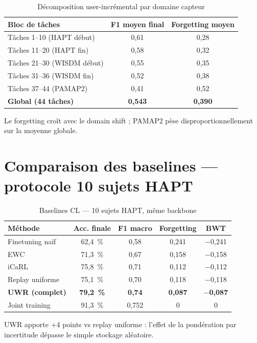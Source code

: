 \documentclass[a4paper,12pt]{report}
\begin{document}
\begin{table}[H]
\centering
\small
\begin{tabularx}{0.92\textwidth}{|Y|c|c|}
\hline
\textbf{Bloc de tâches} & \textbf{F1 moyen final} & \textbf{Forgetting moyen} \\
\hline
Tâches 1--10 (HAPT début) & 0,61 & 0,28 \\
Tâches 11--20 (HAPT fin) & 0,58 & 0,32 \\
Tâches 21--30 (WISDM début) & 0,55 & 0,35 \\
Tâches 31--36 (WISDM fin) & 0,52 & 0,38 \\
Tâches 37--44 (PAMAP2) & 0,41 & 0,52 \\
\hline
\textbf{Global (44 tâches)} & \textbf{0,543} & \textbf{0,390} \\
\hline
\end{tabularx}
\caption{Décomposition user-incrémental par domaine capteur}
\label{tab:app_user_blocks}
\end{table}

Le forgetting croît avec le domain shift ; PAMAP2 pèse disproportionnellement
sur la moyenne globale.

\section{Comparaison des baselines — protocole 10 sujets HAPT}

\begin{table}[H]
\centering
\small
\begin{tabularx}{\textwidth}{|Y|c|c|c|c|}
\hline
\textbf{Méthode} & \textbf{Acc. finale} & \textbf{F1 macro} & \textbf{Forgetting} & \textbf{BWT} \\
\hline
Finetuning naïf & 62,4~\% & 0,58 & 0,241 & $-$0,241 \\
EWC & 71,3~\% & 0,67 & 0,158 & $-$0,158 \\
iCaRL & 75,8~\% & 0,71 & 0,112 & $-$0,112 \\
Replay uniforme & 75,1~\% & 0,70 & 0,118 & $-$0,118 \\
\textbf{UWR (complet)} & \textbf{79,2~\%} & \textbf{0,74} & \textbf{0,087} & \textbf{$-$0,087} \\
Joint training & 91,3~\% & 0,752 & 0 & 0 \\
\hline
\end{tabularx}
\caption{Baselines CL — 10 sujets HAPT, même backbone}
\label{tab:app_baselines_10}
\end{table}

UWR apporte +4 points vs replay uniforme : l'effet de la pondération par
incertitude dépasse le simple stockage aléatoire.
\end{document}
